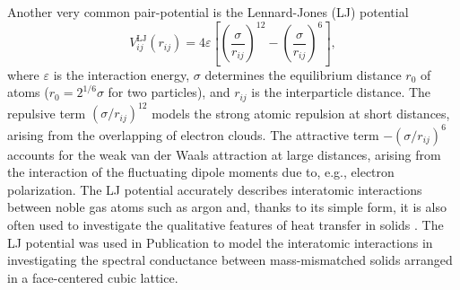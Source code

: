 Another very common pair-potential is the Lennard-Jones (LJ) potential \cite{allentildesley}
\begin{equation}
 V_{ij}^{\textrm{LJ}}(r_{ij}) = 4\varepsilon \left[\left( \frac{\sigma}{r_{ij}}\right)^{12}-\left( \frac{\sigma}{r_{ij}}\right)^6  \right],
\end{equation}
where $\varepsilon$ is the interaction energy, $\sigma$ determines the equilibrium distance $r_0$ of atoms ($r_0=2^{1/6}\sigma$ for two particles), and $r_{ij}$ is the interparticle distance. The repulsive term $(\sigma/r_{ij})^{12}$ models the strong atomic repulsion at short distances, arising from the overlapping of electron clouds. The attractive term $-(\sigma/r_{ij})^{6}$ accounts for the weak van der Waals attraction at large distances, arising from the interaction of the fluctuating dipole moments due to, e.g., electron polarization. The LJ potential accurately describes interatomic interactions between noble gas atoms such as argon and, thanks to its simple form, it is also often used to investigate the qualitative features of heat transfer in solids \cite{}. The LJ potential was used in Publication  to model the interatomic interactions in investigating the spectral conductance between mass-mismatched solids arranged in a face-centered cubic lattice. %


